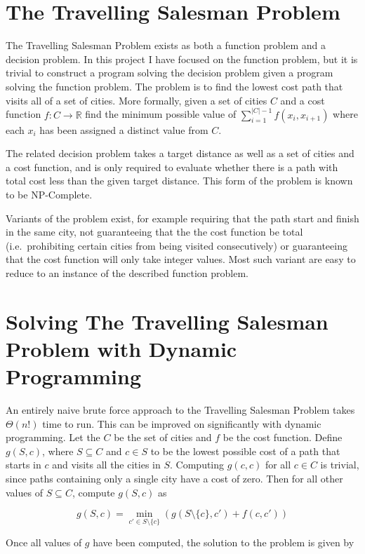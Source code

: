 \documentclass[12pt,a4paper,twoside,openright]{report}
\begin{document}
\section{The Travelling Salesman Problem}
The Travelling Salesman Problem exists as both a function problem and a decision problem. In this project I have focused on the function problem, but it is trivial to construct a program solving the decision problem given a program solving the function problem. The problem is to find the lowest cost path that visits all of a set of cities. More formally, given a set of cities $C$ and a cost function $f: C\to\mathbb{R}$ find the minimum possible value of $\sum_{i=1}^{|C|-1}f(x_i,x_{i+1})$ where each $x_i$ has been assigned a distinct value from $C$.

The related decision problem takes a target distance as well as a set of cities and a cost function, and is only required to evaluate whether there is a path with total cost less than the given target distance. This form of the problem is known to be NP-Complete.

Variants of the problem exist, for example requiring that the path start and finish in the same city, not guaranteeing that the the cost function be total (i.e.\ prohibiting certain cities from being visited consecutively) or guaranteeing that the cost function will only take integer values. Most such variant are easy to reduce to an instance of the described function problem.

\section{Solving The Travelling Salesman Problem with Dynamic Programming} \label{dynamicprogramming}
An entirely naive brute force approach to the Travelling Salesman Problem takes $\Theta(n!)$ time to run. This can be improved on significantly with dynamic programming. Let the $C$ be the set of cities and $f$ be the cost function. Define $g(S, c)$, where $S\subseteq C$ and $c\in S$ to be the lowest possible cost of a path that starts in $c$ and visits all the cities in $S$. Computing $g({c}, c)$ for all $c\in C$ is trivial, since paths containing only a single city have a cost of zero. Then for all other values of $S\subseteq C$, compute $g(S,c)$ as 

$$
g(S,c)=\min_{c'\in S\setminus\{c\}}(g(S\setminus\{c\},c') + f(c,c'))
$$

Once all values of $g$ have been computed, the solution to the problem is given by
\end{document}
